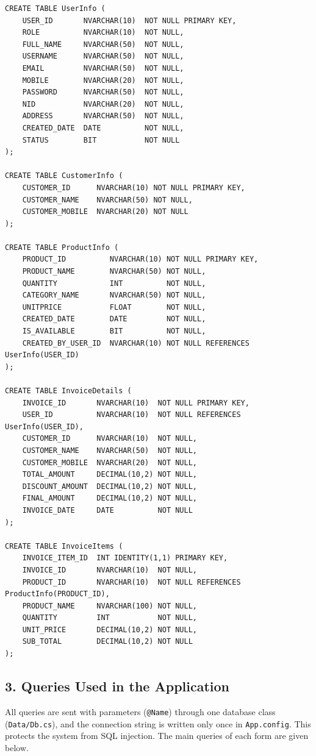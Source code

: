 \documentclass[12pt,a4paper]{article}
\begin{document}
\begin{lstlisting}
CREATE TABLE UserInfo (
    USER_ID       NVARCHAR(10)  NOT NULL PRIMARY KEY,
    ROLE          NVARCHAR(10)  NOT NULL,
    FULL_NAME     NVARCHAR(50)  NOT NULL,
    USERNAME      NVARCHAR(50)  NOT NULL,
    EMAIL         NVARCHAR(50)  NOT NULL,
    MOBILE        NVARCHAR(20)  NOT NULL,
    PASSWORD      NVARCHAR(50)  NOT NULL,
    NID           NVARCHAR(20)  NOT NULL,
    ADDRESS       NVARCHAR(50)  NOT NULL,
    CREATED_DATE  DATE          NOT NULL,
    STATUS        BIT           NOT NULL
);

CREATE TABLE CustomerInfo (
    CUSTOMER_ID      NVARCHAR(10) NOT NULL PRIMARY KEY,
    CUSTOMER_NAME    NVARCHAR(50) NOT NULL,
    CUSTOMER_MOBILE  NVARCHAR(20) NOT NULL
);

CREATE TABLE ProductInfo (
    PRODUCT_ID          NVARCHAR(10) NOT NULL PRIMARY KEY,
    PRODUCT_NAME        NVARCHAR(50) NOT NULL,
    QUANTITY            INT          NOT NULL,
    CATEGORY_NAME       NVARCHAR(50) NOT NULL,
    UNITPRICE           FLOAT        NOT NULL,
    CREATED_DATE        DATE         NOT NULL,
    IS_AVAILABLE        BIT          NOT NULL,
    CREATED_BY_USER_ID  NVARCHAR(10) NOT NULL REFERENCES UserInfo(USER_ID)
);

CREATE TABLE InvoiceDetails (
    INVOICE_ID       NVARCHAR(10)  NOT NULL PRIMARY KEY,
    USER_ID          NVARCHAR(10)  NOT NULL REFERENCES UserInfo(USER_ID),
    CUSTOMER_ID      NVARCHAR(10)  NOT NULL,
    CUSTOMER_NAME    NVARCHAR(50)  NOT NULL,
    CUSTOMER_MOBILE  NVARCHAR(20)  NOT NULL,
    TOTAL_AMOUNT     DECIMAL(10,2) NOT NULL,
    DISCOUNT_AMOUNT  DECIMAL(10,2) NOT NULL,
    FINAL_AMOUNT     DECIMAL(10,2) NOT NULL,
    INVOICE_DATE     DATE          NOT NULL
);

CREATE TABLE InvoiceItems (
    INVOICE_ITEM_ID  INT IDENTITY(1,1) PRIMARY KEY,
    INVOICE_ID       NVARCHAR(10)  NOT NULL,
    PRODUCT_ID       NVARCHAR(10)  NOT NULL REFERENCES ProductInfo(PRODUCT_ID),
    PRODUCT_NAME     NVARCHAR(100) NOT NULL,
    QUANTITY         INT           NOT NULL,
    UNIT_PRICE       DECIMAL(10,2) NOT NULL,
    SUB_TOTAL        DECIMAL(10,2) NOT NULL
);
\end{lstlisting}

\subsection{3. Queries Used in the Application}
All queries are sent with parameters (\texttt{@Name}) through one database class (\texttt{Data/Db.cs}), and the connection string is written only once in \texttt{App.config}. This protects the system from SQL injection. The main queries of each form are given below.
\end{document}
